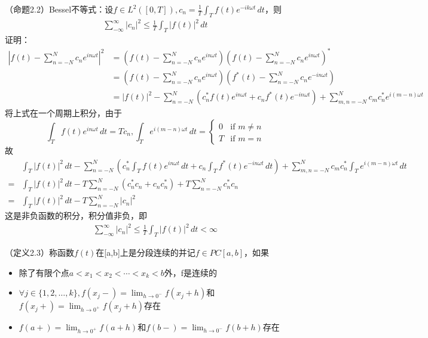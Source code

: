 \documentclass{ctexart}
\begin{document}
（命题2.2）Bessel不等式：设$ f\in L^2([0,T]),c_n=\frac{1}{T}\int_{T}f(t)e^{-ik\omega t}\,dt$，则
\begin{align}
    \sum_{-\infty}^{\infty}|c_n|^2\leq \frac{1}{T}\int_{T}|f(t)|^2\,dt
\end{align}
证明：
\begin{align*}
    |f(t)-\sum_{n=-N}^{N}c_n e^{in\omega t}|^2 & =(f(t)-\sum_{n=-N}^{N}c_n e^{in\omega t})(f(t)-\sum_{n=-N}^{N}c_n e^{in\omega t})^*                                       \\
                                               & =(f(t)-\sum_{n=-N}^{N}c_n e^{in\omega t})(f^*(t)-\sum_{n=-N}^{N}c_n e^{-in\omega t})                                      \\
                                               & =|f(t)|^2-\sum_{n=-N}^{N}(c_n^*f(t)e^{in\omega t}+c_n f^*(t)e^{-in\omega t})+\sum_{m,n=-N}^{N}c_m c_n^*e^{i(m-n)\omega t}
\end{align*}
将上式在一个周期上积分，由于
\[\int_{T}f(t)e^{in\omega t}\,dt=Tc_n,\int_{T}e^{i(m-n)\omega t}\,dt=\begin{cases}
        0 & \text{if }m\neq n \\
        T & \text{if }m=n
    \end{cases}\]
故\begin{align*}
      & \int_{T}|f(t)|^2\,dt-\sum_{n=-N}^{N}(c_n^*\int_{T}f(t)e^{in\omega t}\,dt+c_n \int_{T}f^*(t)e^{-in\omega t}\,dt)+\sum_{m,n=-N}^{N}c_m c_n^*\int_{T}e^{i(m-n)\omega t}\,dt \\
    = & \int_{T}|f(t)|^2\,dt-T\sum_{n=-N}^{N}(c_n^* c_n+c_n c_n^*)+T\sum_{n=-N}^{N}c_n^* c_n                                                                                     \\
    = & \int_{T}|f(t)|^2\,dt-T\sum_{n=-N}^{N}|c_n|^2
\end{align*}
这是非负函数的积分，积分值非负，即\begin{align*}
    \sum_{-\infty}^{\infty}|c_n|^2\leq \frac{1}{T}\int_{T}|f(t)|^2\,dt<\infty
\end{align*}

（定义2.3）称函数$f(t)$在[a,b]上是分段连续的并记$f\in PC[a,b]$，如果
\begin{itemize}
    \item 除了有限个点$a<x_1<x_2<\cdots<x_k<b$外，f是连续的
    \item $\forall j\in\{1,2,\dots,k\},f(x_j-)=\lim_{h\to 0^-}f(x_j+h)$和$f(x_j+)=\lim_{h\to 0^+}f(x_j+h)$存在
    \item $f(a+)=\lim_{h\to 0^+}f(a+h)$和$f(b-)=\lim_{h\to 0^-}f(b+h)$存在
\end{itemize}
\end{document}
